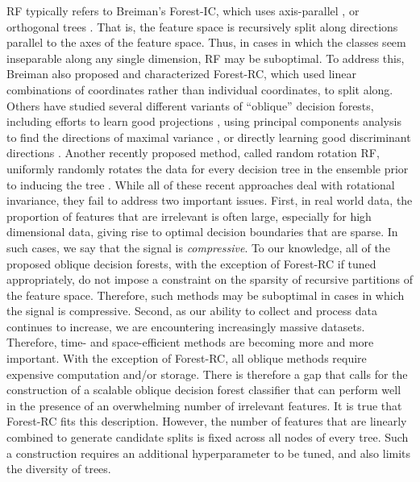 \documentclass{article}
\begin{document}
RF typically refers to Breiman's Forest-IC, which uses axis-parallel \cite{Heath1993}, or orthogonal trees \cite{Menze2011}. That is, the feature space is recursively split along directions parallel to the axes of the feature space. Thus, in cases in which the classes seem inseparable along any single dimension, RF may be suboptimal. To address this, Breiman also proposed and characterized Forest-RC, which used linear combinations of coordinates rather than individual coordinates, to split along. Others have studied several different variants of ``oblique'' decision forests, including efforts to learn good projections \cite{Heath1993,Tan2005}, using principal components analysis to find the directions of maximal variance \cite{Ho1998,Rodriguez2006}, or directly learning good discriminant directions \cite{Menze2011}. Another recently proposed method, called random rotation RF, uniformly randomly rotates the data for every decision tree in the ensemble prior to inducing the tree \cite{Blaser2015}. While all of these recent approaches deal with rotational invariance, they fail to address two important issues. First, in real world data, the proportion of features that are irrelevant is often large, especially for high dimensional data, giving rise to optimal decision boundaries that are sparse. In such cases, we say that the signal is \textit{compressive}. To our knowledge, all of the proposed oblique decision forests, with the exception of Forest-RC if tuned appropriately, do not impose a constraint on the sparsity of recursive partitions of the feature space. Therefore, such methods may be suboptimal in cases in which the signal is compressive. Second, as our ability to collect and process data continues to increase, we are encountering increasingly massive datasets. Therefore, time- and space-efficient methods are becoming more and more important. With the exception of Forest-RC, all oblique methods require expensive computation and/or storage. There is therefore a gap that calls for the construction of a scalable oblique decision forest classifier that can perform well in the presence of an overwhelming number of irrelevant features. It is true that Forest-RC fits this description. However, the number of features that are linearly combined to generate candidate splits is fixed across all nodes of every tree. Such a construction requires an additional hyperparameter to be tuned, and also limits the diversity of trees. 
\end{document}
